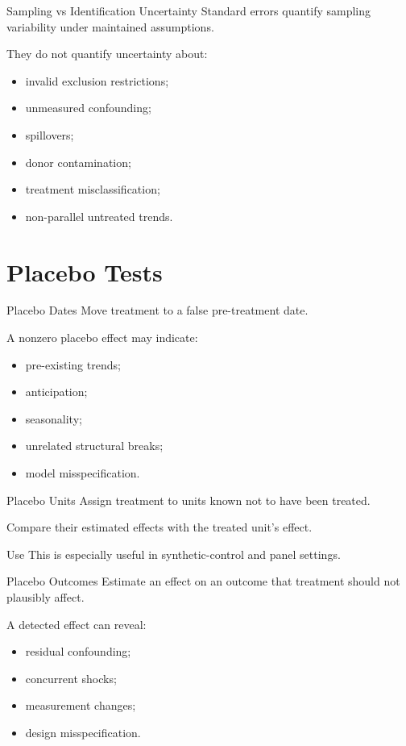 \documentclass[aspectratio=169,11pt]{beamer}
\begin{document}
\begin{frame}{Sampling vs Identification Uncertainty}
Standard errors quantify sampling variability under maintained assumptions.

They do not quantify uncertainty about:
\begin{itemize}
\item invalid exclusion restrictions;
\item unmeasured confounding;
\item spillovers;
\item donor contamination;
\item treatment misclassification;
\item non-parallel untreated trends.
\end{itemize}
\end{frame}

\section{Placebo Tests}

\begin{frame}{Placebo Dates}
Move treatment to a false pre-treatment date.

A nonzero placebo effect may indicate:
\begin{itemize}
\item pre-existing trends;
\item anticipation;
\item seasonality;
\item unrelated structural breaks;
\item model misspecification.
\end{itemize}
\end{frame}

\begin{frame}{Placebo Units}
Assign treatment to units known not to have been treated.

Compare their estimated effects with the treated unit's effect.

\begin{block}{Use}
This is especially useful in synthetic-control and panel settings.
\end{block}
\end{frame}

\begin{frame}{Placebo Outcomes}
Estimate an effect on an outcome that treatment should not plausibly affect.

A detected effect can reveal:
\begin{itemize}
\item residual confounding;
\item concurrent shocks;
\item measurement changes;
\item design misspecification.
\end{itemize}
\end{frame}
\end{document}
